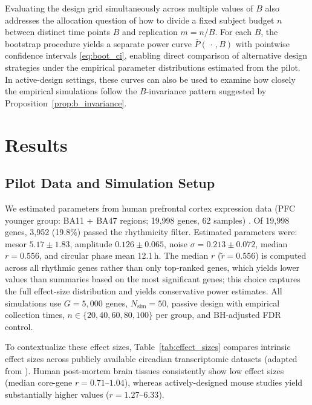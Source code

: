 \documentclass{article}
\begin{document}
Evaluating the design grid simultaneously across multiple values of $B$
also addresses the allocation question of how to divide a fixed subject budget
$n$ between distinct time points $B$ and replication $m=n/B$. For each $B$,
the bootstrap procedure yields a separate power curve $\bar{P}(\,\cdot\,,B)$
with pointwise confidence intervals \eqref{eq:boot_ci}, enabling direct
comparison of alternative design strategies under the empirical parameter
distributions estimated from the pilot. In active-design settings, these curves
can also be used to examine how closely the empirical simulations follow the
$B$-invariance pattern suggested by Proposition~\ref{prop:b_invariance}.


\section{Results}

\subsection{Pilot Data and Simulation Setup}

We estimated parameters from human prefrontal cortex expression data (PFC younger group: BA11 + BA47 regions; 19,998 genes, 62 samples) \cite{chen2016aging}. Of 19,998 genes, 3,952 (19.8\%) passed the rhythmicity filter. Estimated parameters were: mesor $5.17 \pm 1.83$, amplitude $0.126 \pm 0.065$, noise $\sigma = 0.213 \pm 0.072$, median $r = 0.556$, and circular phase mean 12.1\,h. The median $r$ ($\tilde{r} = 0.556$) is computed across all rhythmic genes rather than only top-ranked genes, which yields lower values than summaries based on the most significant genes; this choice captures the full effect-size distribution and yields conservative power estimates. All simulations use $G = 5{,}000$ genes, $N_{\text{sim}} = 50$, passive design with empirical collection times, $n \in \{20, 40, 60, 80, 100\}$ per group, and BH-adjusted FDR control.

To contextualize these effect sizes, Table~\ref{tab:effect_sizes} compares intrinsic effect sizes across publicly available circadian transcriptomic datasets (adapted from \cite{zong2023circapower}). Human post-mortem brain tissues consistently show low effect sizes (median core-gene $r = 0.71$--$1.04$), whereas actively-designed mouse studies yield substantially higher values ($r = 1.27$--$6.33$).
\end{document}
